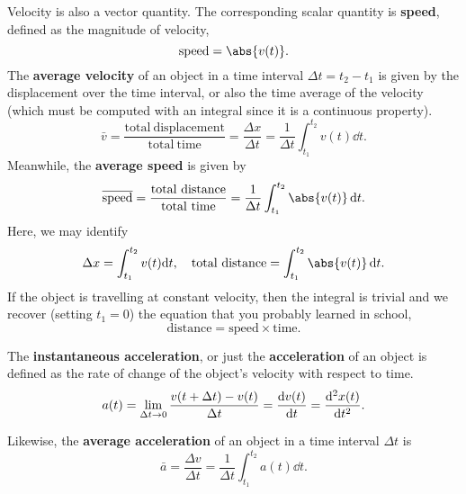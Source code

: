 \documentclass[../classical_mechanics.tex]{subfiles}
\begin{document}
        Velocity is also a vector quantity.
        The corresponding scalar quantity is \textbf{speed}, defined as the magnitude of velocity,
        \begin{equation}
            \mathrm{speed}=\abs{v(t)}.
        \end{equation}
        The \textbf{average velocity} of an object in a time interval $\Delta t=t_2-t_1$ is given by the displacement over the time interval, or also the time average of the velocity (which must be computed with an integral since it is a continuous property).
        \begin{equation}
            \bar{v}=\frac{\mathrm{total\ displacement}}{\mathrm{total\ time}}=\frac{\Delta x}{\Delta t}=\frac{1}{\Delta t}\int_{t_1}^{t_2}v(t)\dd{t}.
        \end{equation}
        Meanwhile, the \textbf{average speed} is given by
        \begin{equation}
            \overline{\mathrm{speed}}=\frac{\mathrm{total\ distance}}{\mathrm{total\ time}}=\frac{1}{\Delta t}\int_{t_1}^{t_2}\abs{v(t)}\dd{t}.
        \end{equation}
        Here, we may identify
        \begin{equation}\label{eq:total-disp}
            \Delta x=\int_{t_1}^{t_2}v(t)\mathrm{d}t,\quad \mathrm{total\ distance}=\int_{t_1}^{t_2}\abs{v(t)}\dd{t}.
        \end{equation}
        If the object is travelling at constant velocity, then the integral is trivial and we recover (setting $t_1=0$) the equation that you probably learned in school,
        \begin{equation}
            \mathrm{distance}=\mathrm{speed}\times\mathrm{time}.
        \end{equation}
        \begin{definition}
            The \textbf{instantaneous acceleration}, or just the \textbf{acceleration} of an object is defined as the rate of change of the object's velocity with respect to time.
            \begin{equation}
                a(t)=\lim_{\Delta t\to0}\frac{v(t+\Delta t)-v(t)}{\Delta t}=\dv{v(t)}{t}=\dv[2]{x(t)}{t}.
            \end{equation}
        \end{definition}
        Likewise, the \textbf{average acceleration} of an object in a time interval $\Delta t$ is
        \begin{equation}\label{eq:average-acc}
            \bar{a}=\frac{\Delta v}{\Delta t}=\frac{1}{\Delta t}\int_{t_1}^{t_2}a(t)\dd{t}.
        \end{equation}
\end{document}
